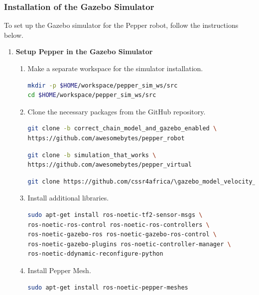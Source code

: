 \documentclass{CSSRforAfrica}
\begin{document}
{\subsubsection*{Installation of the Gazebo Simulator}
To set up the Gazebo simulator for the Pepper robot, follow the instructions below.

\begin{enumerate}
\item \textbf{Setup Pepper in the Gazebo Simulator}
\begin{enumerate}
\item Make a separate workspace for the simulator installation.
\begin{lstlisting}[style=withoutNumbering, language=bash]
mkdir -p $HOME/workspace/pepper_sim_ws/src
cd $HOME/workspace/pepper_sim_ws/src
\end{lstlisting} 

\item Clone the necessary packages from the GitHub repository.
\begin{lstlisting}[style=withoutNumbering, language=bash]
git clone -b correct_chain_model_and_gazebo_enabled \
https://github.com/awesomebytes/pepper_robot
\end{lstlisting} 

\begin{lstlisting}[style=withoutNumbering, language=bash]
git clone -b simulation_that_works \
https://github.com/awesomebytes/pepper_virtual
\end{lstlisting} 

\begin{lstlisting}[style=withoutNumbering, language=bash]
git clone https://github.com/cssr4africa/\gazebo_model_velocity_plugin
\end{lstlisting} 

\item Install additional libraries.
\begin{lstlisting}[style=withoutNumbering, language=bash]
sudo apt-get install ros-noetic-tf2-sensor-msgs \
ros-noetic-ros-control ros-noetic-ros-controllers \
ros-noetic-gazebo-ros ros-noetic-gazebo-ros-control \
ros-noetic-gazebo-plugins ros-noetic-controller-manager \
ros-noetic-ddynamic-reconfigure-python
\end{lstlisting}

\item Install Pepper Mesh.
\begin{lstlisting}[style=withoutNumbering, language=bash]
sudo apt-get install ros-noetic-pepper-meshes
\end{lstlisting}


\end{enumerate}
\end{enumerate}}
\end{document}
